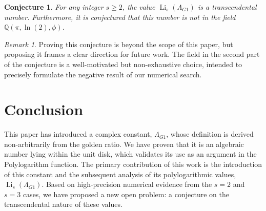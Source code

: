 \documentclass{amsart}
\theoremstyle{plain}
\newtheorem{conjecture}[theorem]{Conjecture}
\theoremstyle{definition}
\theoremstyle{remark}
\newtheorem*{remark}{Remark}
\DeclareMathOperator{\Li}{Li}
\newcommand{\LambdaG}{\Lambda_{G1}}
\newcommand{\phiG}{\phi}
\begin{document}
\begin{conjecture}
For any integer $s \ge 2$, the value $\Li_s(\LambdaG)$ is a transcendental number. Furthermore, it is conjectured that this number is not in the field $\mathbb{Q}(\pi, \ln(2), \phiG)$.
\end{conjecture}

\begin{remark}
Proving this conjecture is beyond the scope of this paper, but proposing it frames a clear direction for future work. The field in the second part of the conjecture is a well-motivated but non-exhaustive choice, intended to precisely formulate the negative result of our numerical search.
\end{remark}

\section{Conclusion}
This paper has introduced a complex constant, $\LambdaG$, whose definition is derived non-arbitrarily from the golden ratio. We have proven that it is an algebraic number lying within the unit disk, which validates its use as an argument in the Polylogarithm function. The primary contribution of this work is the introduction of this constant and the subsequent analysis of its polylogarithmic values, $\Li_s(\LambdaG)$. Based on high-precision numerical evidence from the $s=2$ and $s=3$ cases, we have proposed a new open problem: a conjecture on the transcendental nature of these values.

\end{document}
